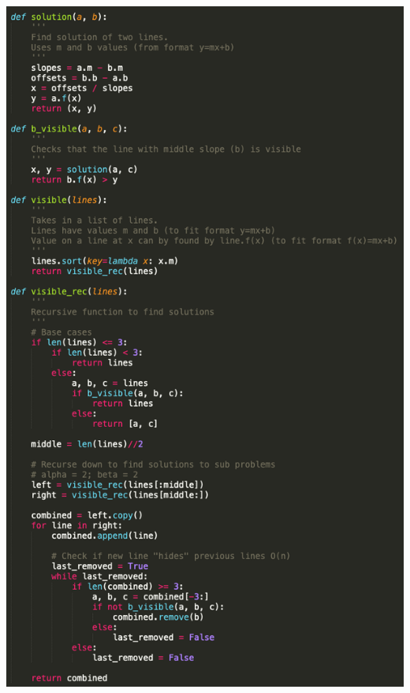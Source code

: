 \documentclass[11pt]{article}
\begin{document}
\includegraphics[scale=0.4]{code.png}
\end{document}
